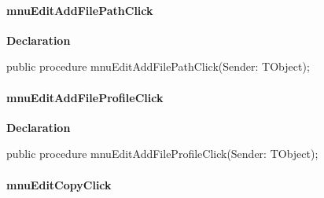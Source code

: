 \documentclass{report}
\newif\ifpdf
\begin{document}
\paragraph*{mnuEditAddFilePathClick}\hspace*{\fill}

\label{editor.TFrmEditor-mnuEditAddFilePathClick}
\begin{list}{}{
\setlength{\itemindent}{0cm}
\setlength{\listparindent}{0cm}
\setlength{\leftmargin}{\evensidemargin}
\addtolength{\leftmargin}{\tmplength}
\settowidth{\labelsep}{X}
\addtolength{\leftmargin}{\labelsep}
\setlength{\labelwidth}{\tmplength}
}
\item[\textbf{Declaration}\hfill]
\ifpdf
\begin{flushleft}
\fi
\begin{ttfamily}
public procedure mnuEditAddFilePathClick(Sender: TObject);\end{ttfamily}

\ifpdf
\end{flushleft}
\fi

\end{list}
\paragraph*{mnuEditAddFileProfileClick}\hspace*{\fill}

\label{editor.TFrmEditor-mnuEditAddFileProfileClick}
\begin{list}{}{
\setlength{\itemindent}{0cm}
\setlength{\listparindent}{0cm}
\setlength{\leftmargin}{\evensidemargin}
\addtolength{\leftmargin}{\tmplength}
\settowidth{\labelsep}{X}
\addtolength{\leftmargin}{\labelsep}
\setlength{\labelwidth}{\tmplength}
}
\item[\textbf{Declaration}\hfill]
\ifpdf
\begin{flushleft}
\fi
\begin{ttfamily}
public procedure mnuEditAddFileProfileClick(Sender: TObject);\end{ttfamily}

\ifpdf
\end{flushleft}
\fi

\end{list}
\paragraph*{mnuEditCopyClick}\hspace*{\fill}
\end{document}
